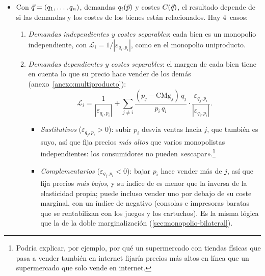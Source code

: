 \documentclass[11pt]{article}
\begin{document}
\begin{itemize}
\item Con $\vec{q}=(q_1,\dots,q_n)$, demandas $q_i(\vec{p})$ y costes $C(\vec{q})$, el resultado depende de si las demandas y los costes de los bienes están relacionados. Hay 4~casos:
  \begin{enumerate}[label=\roman*)]
  \item \emph{Demandas independientes y costes separables}: cada bien es un monopolio independiente, con $\mathcal{L}_i=1/|\varepsilon_{q_i,p_i}|$, como en el monopolio uniproducto.
  \item \emph{Demandas dependientes y costes separables}: el margen de cada bien tiene en cuenta lo que su precio hace vender de los demás (anexo~\ref{anexo:multiproducto}):
    \begin{equation}
    \mathcal{L}_i=\frac{1}{|\varepsilon_{q_i,p_i}|}+\sum_{j\neq i}\frac{(p_j-\mathrm{CMg}_j)\,q_j}{p_i\,q_i}\cdot\frac{\varepsilon_{q_j,p_i}}{|\varepsilon_{q_i,p_i}|} . \label{eq:lerner-multi}
    \end{equation}
    \begin{itemize}
    \item \emph{Sustitutivos} ($\varepsilon_{q_j,p_i}>0$): subir $p_i$ desvía ventas hacia $j$, que también es suyo, así que fija precios \emph{más altos} que varios monopolistas independientes: los consumidores no pueden «escapar».\footnote{Podría explicar, por ejemplo, por qué un supermercado con tiendas físicas que pasa a vender también en internet fijaría precios más altos en línea que un supermercado que solo vende en internet.}
    \item \emph{Complementarios} ($\varepsilon_{q_j,p_i}<0$): bajar $p_i$ hace vender más de $j$, así que fija precios \emph{más bajos}, y su índice de  es menor que la inversa de la elasticidad propia; puede incluso vender uno por debajo de su coste marginal, con un índice de  negativo (consolas e impresoras baratas que se rentabilizan con los juegos y los cartuchos). Es la misma lógica que la de la doble marginalización (\ref{sec:monopolio-bilateral}).
    \end{itemize}

\end{enumerate}
\end{itemize}
\end{document}
